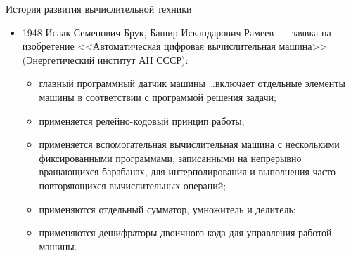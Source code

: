 \documentclass[aspectratio=169,14pt]{beamer}
\begin{document}
\begin{frame}{История развития вычислительной техники}
    \begin{itemize}
        \item 1948 Исаак Семенович Брук, Башир Искандарович Рамеев~--- заявка на
        изобретение <<Автоматическая цифровая вычислительная машина>>
        (Энергетический институт АН СССР):
        \begin{itemize}
            \item главный программный датчик машины \ldots включает отдельные элементы машины
            в соответствии с программой решения задачи;
            \item применяется релейно-кодовый принцип работы;
            \item применяется вспомогательная вычислительная машина
            с несколькими фиксированными программами, записанными на непрерывно
            вращающихся барабанах, для интерполирования и выполнения часто повторяющихся
            вычислительных операций;
            \item применяются отдельный сумматор, умножитель и делитель;
            \item применяются дешифраторы двоичного кода для управления работой машины.
        \end{itemize}
    \end{itemize}
\end{frame}
\end{document}
